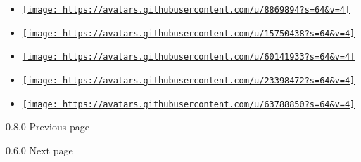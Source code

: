 \begin{itemize}
\item
  \href{https://github.com/pineapplehunter}{\texttt{[image: https://avatars.githubusercontent.com/u/8869894?s=64\&v=4]}}
\item
  \href{https://github.com/raphCode}{\texttt{[image: https://avatars.githubusercontent.com/u/15750438?s=64\&v=4]}}
\item
  \href{https://github.com/sitandr}{\texttt{[image: https://avatars.githubusercontent.com/u/60141933?s=64\&v=4]}}
\item
  \href{https://github.com/sudormrfbin}{\texttt{[image: https://avatars.githubusercontent.com/u/23398472?s=64\&v=4]}}
\item
  \href{https://github.com/tretre91}{\texttt{[image: https://avatars.githubusercontent.com/u/63788850?s=64\&v=4]}}
\end{itemize}

\href{/docs/changelog/0.8.0/}{\pandocbounded{}}

{ 0.8.0 } { Previous page }

\href{/docs/changelog/0.6.0/}{\pandocbounded{}}

{ 0.6.0 } { Next page }
